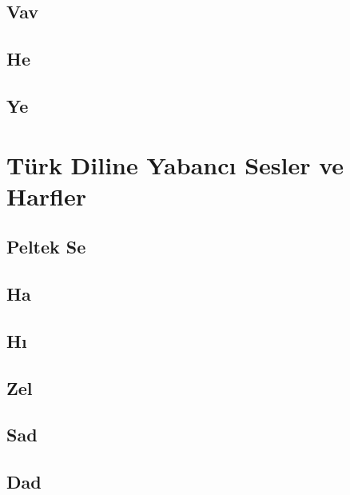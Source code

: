 \subsection*{Vav}
\uyumluharftablo{\arvav}{\Lvav\latdownvav}{\isimvav}{\trtlfvav}

\subsection*{He}
\uyumluharftablo{\arhe}{\Lhe\latdownhe}{\isimhe}{\trtlfhe}

\subsection*{Ye}
\uyumluharftablo{\arye}{\Lye\latdownye}{\isimye}{\trtlfye}



\section{Türk Diline Yabancı Sesler ve Harfler}

\subsection*{Peltek Se}
\hariciharftablo{\arthe}{\Lthe\latdownthe}{\isimthe}{\trtlfthe}{\artlfthe}

\subsection*{Ha}
\hariciharftablo{\arha}{\Lha\latdownha}{\isimha}{\trtlfha}{\artlfha}

\subsection*{Hı}
\hariciharftablo{\arxa}{\Lxa\latdownxa}{\isimxa}{\trtlfxa}{\artlfxa}

\subsection*{Zel}
\hariciharftablo{\arzel}{\Lzel\latdownzel}{\isimzel}{\trtlfzel}{\artlfzel}

\subsection*{Sad}
\hariciharftablo{\arsad}{\Lsad\latdownsad}{\isimsad}{\trtlfsad}{\artlfsad}

\subsection*{Dad}
\hariciharftablo{\ardad}{\Ldad\latdowndad}{\isimdad}{\trtlfdad}{\artlfdad}


